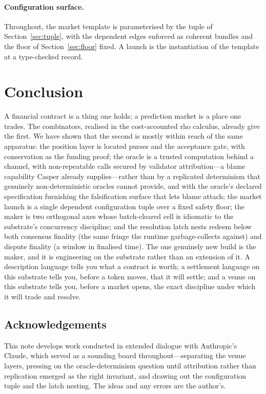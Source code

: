 \documentclass[11pt]{article}
\begin{document}
\paragraph{Configuration surface.} Throughout, the market template is parameterised by the
tuple of Section~\ref{sec:tuple}, with the dependent edges enforced as coherent bundles and the
floor of Section~\ref{sec:floor} fixed. A launch is the instantiation of the template at a
type-checked record.

\section{Conclusion}\label{sec:conclusion}

A financial contract is a thing one holds; a prediction market is a place one trades. The
combinators, realised in the cost-accounted rho calculus, already give the first. We have shown
that the second is mostly within reach of the same apparatus: the position layer is located
purses and the acceptance gate, with conservation as the funding proof; the oracle is a trusted
computation behind a channel, with non-repeatable calls secured by validator attribution---a
blame capability Casper already supplies---rather than by a replicated determinism that genuinely
non-deterministic oracles cannot provide, and with the oracle's declared specification furnishing
the falsification surface that lets blame attach; the market launch is a single dependent
configuration tuple over a fixed safety floor; the maker is two orthogonal axes whose
batch-cleared cell is idiomatic to the substrate's concurrency discipline; and the
resolution latch nests redeem below both consensus finality (the same fringe the runtime
garbage-collects against) and dispute finality (a window in finalised time). The one genuinely
new build is the maker, and it is engineering on the substrate rather than an extension of it.
A description language tells you what a contract is worth; a settlement language on this
substrate tells you, before a token moves, that it will settle; and a venue on this substrate
tells you, before a market opens, the exact discipline under which it will trade and resolve.

\subsection*{Acknowledgements}
This note develops work conducted in extended dialogue with Anthropic's Claude, which served as
a sounding board throughout---separating the venue layers, pressing on the oracle-determinism
question until attribution rather than replication emerged as the right invariant, and drawing
out the configuration tuple and the latch nesting. The ideas and any errors are the author's.
\end{document}

